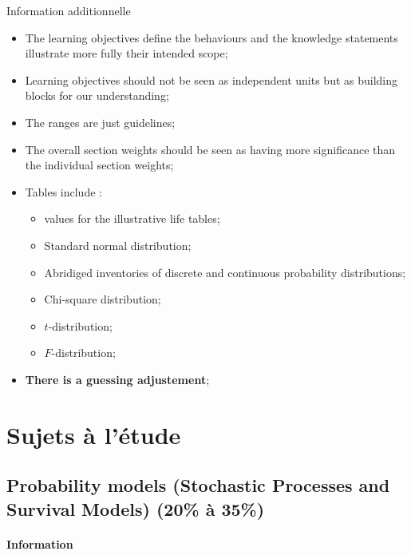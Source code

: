 \documentclass[12pt, titlepage, french]{report}
\begin{document}
\begin{CHPT_SUMM}{Information additionnelle}
	\begin{itemize}
		\item	The learning objectives define the behaviours and the knowledge statements illustrate more fully their intended scope;
		\item	Learning objectives should not be seen as independent units but as building blocks for our understanding;
		\item	The ranges are just guidelines;
		\item	The overall section weights should be seen as having more significance than the individual section weights;
		\item	Tables include :
			\begin{itemize}
			\item	values for the illustrative life tables;
			\item	Standard normal distribution;
			\item	Abridiged inventories of discrete and continuous probability distributions;
			\item	Chi-square distribution;
			\item	$t$-distribution;
			\item	$F$-distribution;
			\end{itemize}
		\item	\textbf{There is a guessing adjustement};
	\end{itemize}
\end{CHPT_SUMM}

\part*{Sujets à l'étude}

\chapter[Probability models (Stochastic Processes and Survival Models)]{Probability models (Stochastic Processes and Survival Models) (20\% à 35\%)}

\subsection{Information}
\end{document}
